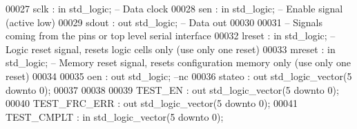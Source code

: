 \begin{DoxyCode}
00027         \textcolor{vhdlchar}{sclk}                        \textcolor{vhdlchar}{:} \textcolor{keywordflow}{in} \textcolor{comment}{std\_logic};\textcolor{keyword}{     -- Data clock}
00028         \textcolor{vhdlchar}{sen}                     \textcolor{vhdlchar}{:} \textcolor{keywordflow}{in} \textcolor{comment}{std\_logic};\textcolor{keyword}{ -- Enable signal (active low)}
00029         \textcolor{vhdlchar}{sdout}                       \textcolor{vhdlchar}{:} \textcolor{keywordflow}{out} \textcolor{comment}{std\_logic};\textcolor{keyword}{    -- Data out}
00030     
00031 \textcolor{keyword}{        -- Signals coming from the pins or top level serial interface}
00032         \textcolor{vhdlchar}{lreset}                  \textcolor{vhdlchar}{:} \textcolor{keywordflow}{in} \textcolor{comment}{std\_logic};\textcolor{keyword}{     -- Logic reset signal, resets logic cells only  (use
       only one reset)}
00033         \textcolor{vhdlchar}{mreset}                  \textcolor{vhdlchar}{:} \textcolor{keywordflow}{in} \textcolor{comment}{std\_logic};\textcolor{keyword}{     -- Memory reset signal, resets configuration memory
       only (use only one reset)}
00034         
00035         \textcolor{vhdlchar}{oen}                     \textcolor{vhdlchar}{:} \textcolor{keywordflow}{out} \textcolor{comment}{std\_logic};\textcolor{keyword}{ --nc}
00036         \textcolor{vhdlchar}{stateo}                  \textcolor{vhdlchar}{:} \textcolor{keywordflow}{out} \textcolor{comment}{std\_logic\_vector}\textcolor{vhdlchar}{(}\textcolor{vhdllogic}{}\textcolor{vhdllogic}{5} \textcolor{keywordflow}{downto} \textcolor{vhdllogic}{}\textcolor{vhdllogic}{0}\textcolor{vhdlchar}{)};
00037         
00038         
00039         \textcolor{vhdlchar}{TEST_EN}                 \textcolor{vhdlchar}{:} \textcolor{keywordflow}{out} \textcolor{comment}{std\_logic\_vector}\textcolor{vhdlchar}{(}\textcolor{vhdllogic}{}\textcolor{vhdllogic}{5} \textcolor{keywordflow}{downto} \textcolor{vhdllogic}{}\textcolor{vhdllogic}{0}\textcolor{vhdlchar}{)};
00040         \textcolor{vhdlchar}{TEST_FRC_ERR}            \textcolor{vhdlchar}{:} \textcolor{keywordflow}{out} \textcolor{comment}{std\_logic\_vector}\textcolor{vhdlchar}{(}\textcolor{vhdllogic}{}\textcolor{vhdllogic}{5} \textcolor{keywordflow}{downto} \textcolor{vhdllogic}{}\textcolor{vhdllogic}{0}\textcolor{vhdlchar}{)};
00041         \textcolor{vhdlchar}{TEST_CMPLT}              \textcolor{vhdlchar}{:} \textcolor{keywordflow}{in} \textcolor{comment}{std\_logic\_vector}\textcolor{vhdlchar}{(}\textcolor{vhdllogic}{}\textcolor{vhdllogic}{5} \textcolor{keywordflow}{downto} \textcolor{vhdllogic}{}\textcolor{vhdllogic}{0}\textcolor{vhdlchar}{)};

\end{DoxyCode}
